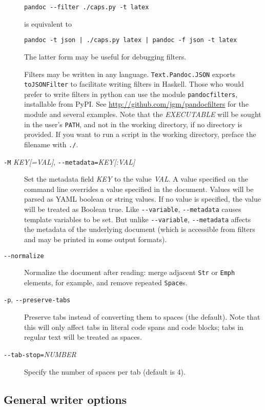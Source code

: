 \documentclass[]{article}
\begin{document}
\begin{description}
\begin{verbatim}
pandoc --filter ./caps.py -t latex
\end{verbatim}

is equivalent to

\begin{verbatim}
pandoc -t json | ./caps.py latex | pandoc -f json -t latex
\end{verbatim}

The latter form may be useful for debugging filters.

Filters may be written in any language. \texttt{Text.Pandoc.JSON}
exports \texttt{toJSONFilter} to facilitate writing filters in Haskell.
Those who would prefer to write filters in python can use the module
\texttt{pandocfilters}, installable from PyPI. See
\url{http://github.com/jgm/pandocfilters} for the module and several
examples. Note that the \emph{EXECUTABLE} will be sought in the user's
\texttt{PATH}, and not in the working directory, if no directory is
provided. If you want to run a script in the working directory, preface
the filename with \texttt{./}.
\item[\texttt{-M} \emph{KEY{[}=VAL{]}},
\texttt{-{}-metadata=}\emph{KEY{[}:VAL{]}}]
Set the metadata field \emph{KEY} to the value \emph{VAL}. A value
specified on the command line overrides a value specified in the
document. Values will be parsed as YAML boolean or string values. If no
value is specified, the value will be treated as Boolean true. Like
\texttt{-{}-variable}, \texttt{-{}-metadata} causes template variables
to be set. But unlike \texttt{-{}-variable}, \texttt{-{}-metadata}
affects the metadata of the underlying document (which is accessible
from filters and may be printed in some output formats).
\item[\texttt{-{}-normalize}]
Normalize the document after reading: merge adjacent \texttt{Str} or
\texttt{Emph} elements, for example, and remove repeated
\texttt{Space}s.
\item[\texttt{-p}, \texttt{-{}-preserve-tabs}]
Preserve tabs instead of converting them to spaces (the default). Note
that this will only affect tabs in literal code spans and code blocks;
tabs in regular text will be treated as spaces.
\item[\texttt{-{}-tab-stop=}\emph{NUMBER}]
Specify the number of spaces per tab (default is 4).
\end{description}

\subsection{General writer options}
\end{document}
